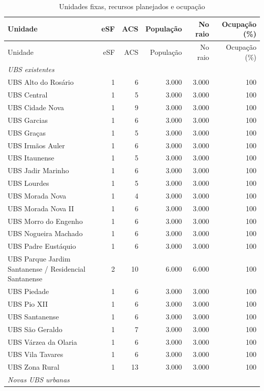 \begingroup\small\begin{longtable}{p{.42\linewidth}rrrrr}
\caption{Unidades fixas, recursos planejados e ocupação}\label{tab:unidades}\\
\toprule Unidade & eSF & ACS & População & No raio & Ocupação (\%)\\\midrule\endfirsthead
\toprule Unidade & eSF & ACS & População & No raio & Ocupação (\%)\\\midrule\endhead
\multicolumn{6}{l}{\textit{UBS existentes}}\\
UBS Alto do Rosário & 1 & 6 & 3.000 & 3.000 & 100\\
UBS Central & 1 & 5 & 3.000 & 3.000 & 100\\
UBS Cidade Nova & 1 & 9 & 3.000 & 3.000 & 100\\
UBS Garcias & 1 & 6 & 3.000 & 3.000 & 100\\
UBS Graças & 1 & 5 & 3.000 & 3.000 & 100\\
UBS Irmãos Auler & 1 & 6 & 3.000 & 3.000 & 100\\
UBS Itaunense & 1 & 5 & 3.000 & 3.000 & 100\\
UBS Jadir Marinho & 1 & 6 & 3.000 & 3.000 & 100\\
UBS Lourdes & 1 & 5 & 3.000 & 3.000 & 100\\
UBS Morada Nova & 1 & 4 & 3.000 & 3.000 & 100\\
UBS Morada Nova II & 1 & 6 & 3.000 & 3.000 & 100\\
UBS Morro do Engenho & 1 & 6 & 3.000 & 3.000 & 100\\
UBS Nogueira Machado & 1 & 6 & 3.000 & 3.000 & 100\\
UBS Padre Eustáquio & 1 & 6 & 3.000 & 3.000 & 100\\
UBS Parque Jardim Santanense / Residencial Santanense & 2 & 10 & 6.000 & 6.000 & 100\\
UBS Piedade & 1 & 6 & 3.000 & 3.000 & 100\\
UBS Pio XII & 1 & 6 & 3.000 & 3.000 & 100\\
UBS Santanense & 1 & 6 & 3.000 & 3.000 & 100\\
UBS São Geraldo & 1 & 7 & 3.000 & 3.000 & 100\\
UBS Várzea da Olaria & 1 & 6 & 3.000 & 3.000 & 100\\
UBS Vila Tavares & 1 & 6 & 3.000 & 3.000 & 100\\
UBS Zona Rural & 1 & 13 & 3.000 & 3.000 & 100\\
\midrule
\multicolumn{6}{l}{\textit{Novas UBS urbanas}}\\

\end{longtable}
